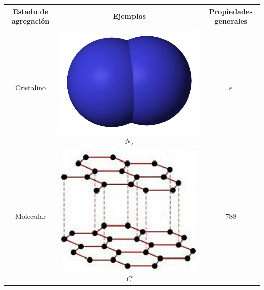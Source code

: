 \documentclass{book}
\begin{document}
\begin{tabular}{| c | c c |}
  \hline
  Estado de agregación & Ejemplos & Propiedades generales \\
  \hline
  Cristalino & \includegraphics[scale=0.05]{dinitrogeno.png} \textit{$ N_{2} $} & s \\
  \hline
  Molecular & \includegraphics[scale=0.20]{grafito.png} \textit{$ C $} & 788 \\
  \hline
\end{tabular}
\end{document}

